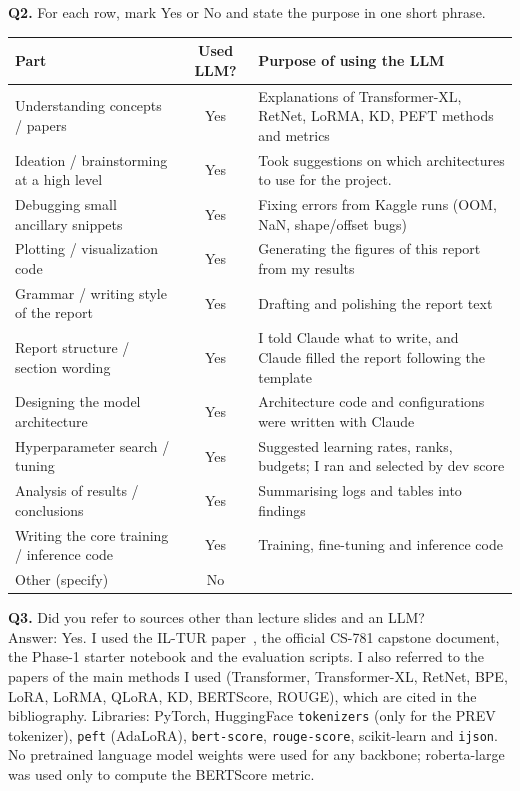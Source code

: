 \documentclass[11pt, oneside]{article}
\begin{document}
\noindent
\textbf{Q2.} For each row, mark Yes or No and state the purpose in one short phrase.
\begin{table}[H]
\centering
\small
\begin{tabular}{>{\raggedright\arraybackslash}p{4.6cm}|c|>{\raggedright\arraybackslash}p{8.6cm}}
\toprule
Part & Used LLM? & Purpose of using the LLM \\
\midrule
Understanding concepts / papers & Yes & Explanations of Transformer-XL, RetNet, LoRMA, KD, PEFT methods and metrics \\
Ideation / brainstorming at a high level & Yes & Took suggestions on which architectures to use for the project.\\
Debugging small ancillary snippets & Yes & Fixing errors from Kaggle runs (OOM, NaN, shape/offset bugs) \\
Plotting / visualization code & Yes & Generating the figures of this report from my results \\
Grammar / writing style of the report & Yes & Drafting and polishing the report text \\
Report structure / section wording & Yes & I told Claude what to write, and Claude filled the report following the template \\
Designing the model architecture & Yes & Architecture code and configurations were written with Claude \\
Hyperparameter search / tuning & Yes & Suggested learning rates, ranks, budgets; I ran and selected by dev score \\
Analysis of results / conclusions & Yes & Summarising logs and tables into findings \\
Writing the core training / inference code & Yes & Training, fine-tuning and inference code \\
Other (specify) & No & \\
\bottomrule
\end{tabular}
\end{table}
\medskip
\noindent
\textbf{Q3.} Did you refer to sources other than lecture slides and an LLM?\\[0.2em]
Answer: Yes. I used the IL-TUR paper~\cite{joshi2024iltur}, the official CS-781 capstone document, the Phase-1 starter notebook and the evaluation scripts. I also referred to the papers of the main methods I used (Transformer, Transformer-XL, RetNet, BPE, LoRA, LoRMA, QLoRA, KD, BERTScore, ROUGE), which are cited in the bibliography. Libraries: PyTorch, HuggingFace \texttt{tokenizers} (only for the PREV tokenizer), \texttt{peft} (AdaLoRA), \texttt{bert-score}, \texttt{rouge-score}, scikit-learn and \texttt{ijson}. No pretrained language model weights were used for any backbone; roberta-large was used only to compute the BERTScore metric.
\medskip
\end{document}

